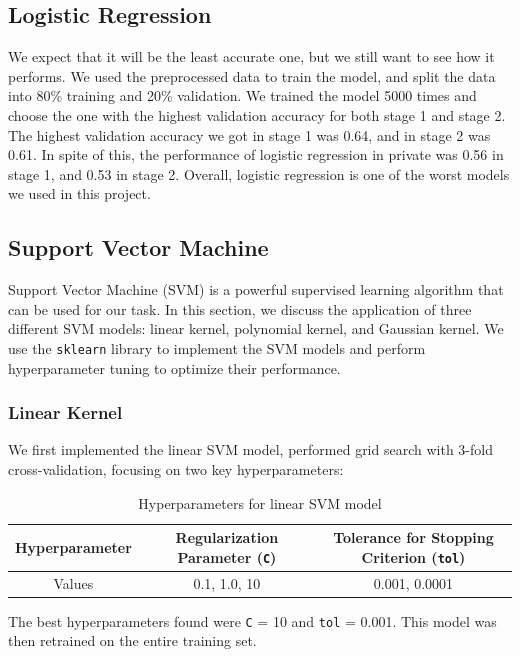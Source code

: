 \documentclass[10pt,a4paper]{article}
\begin{document}
\subsection{Logistic Regression}
We expect that it will be the least accurate one, but we still want to see how it performs.
We used the preprocessed data to train the model, and split the data into 80\% training and 20\% validation.
We trained the model 5000 times and choose the one with the highest validation accuracy for both stage 1 and stage 2.
The highest validation accuracy we got in stage 1 was 0.64, and in stage 2 was 0.61.
In spite of this, the performance of logistic regression in private was 0.56 in stage 1, and 0.53 in stage 2.
Overall, logistic regression is one of the worst models we used in this project.



\subsection{Support Vector Machine}

Support Vector Machine (SVM) is a powerful supervised learning algorithm that can be used for our task. In this section, we discuss the application of three different SVM models: linear kernel, polynomial kernel, and Gaussian kernel. We use the \texttt{sklearn} library to implement the SVM models and perform hyperparameter tuning to optimize their performance.

\subsubsection{Linear Kernel}
We first implemented the linear SVM model, performed grid search with 3-fold cross-validation, focusing on two key hyperparameters:

\begin{table}[H]
  \centering
  \begin{tabular}{|c|c|c|}
  \hline
  Hyperparameter & Regularization Parameter (\texttt{C}) & Tolerance for Stopping Criterion (\texttt{tol}) \\ \hline
  Values & 0.1, 1.0, 10 & 0.001, 0.0001 \\ \hline
  \end{tabular}
  \caption{Hyperparameters for linear SVM model}
\end{table}

The best hyperparameters found were \texttt{C} = 10 and \texttt{tol} = 0.001. This model was then retrained on the entire training set.
\end{document}
